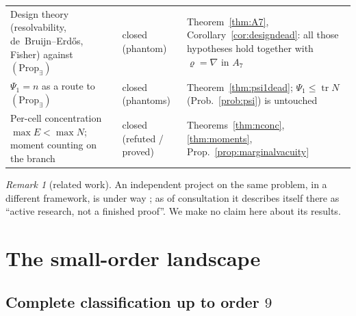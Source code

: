 \documentclass[11pt]{article}
\theoremstyle{plain}
\theoremstyle{definition}
\theoremstyle{remark}
\newtheorem*{remark*}{Remark}
\numberwithin{equation}{section}
\newcommand{\tr}{\operatorname{tr}}
\begin{document}
\begin{center}
\begin{tabular}{p{}p{}p{}}
Design theory (resolvability, de~Bruijn--Erd\H{o}s, Fisher) against
$(\mathrm{Prop}_{\exists})$ & closed (phantom) & Theorem~\ref{thm:A7},
Corollary~\ref{cor:designdead}: all those hypotheses hold together with
$\varrho=\nabla$ in $A_7$\\
$\Psi_1 = n$ as a route to $(\mathrm{Prop}_{\exists})$ & closed (phantoms) &
Theorem~\ref{thm:psi1dead}; $\Psi_1\le\tr N$ (Prob.~\ref{prob:psi}) is untouched\\
Per-cell concentration $\max E<\max N$; moment counting on the branch & closed
(refuted / proved) & Theorems~\ref{thm:nconc}, \ref{thm:moments},
Prop.~\ref{prop:marginalvacuity}\\
\bottomrule
\end{tabular}
\end{center}

\begin{remark*}[related work]
An independent project on the same problem, in a different framework, is under way
\cite{grisha}; as of consultation it describes itself there as ``active research, not a
finished proof''. We make no claim here about its results.
\end{remark*}

\section{The small-order landscape}\label{sec:landscape}

\subsection{Complete classification up to order $9$}
\end{document}
